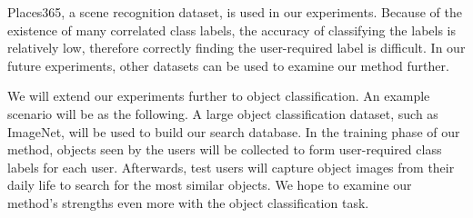 Places365, a scene recognition dataset, is used in our experiments. 
Because of the existence of many correlated class labels, the accuracy of classifying the labels is relatively low, therefore correctly finding the user-required label is difficult. 
In our future experiments, other datasets can be used to examine our method further. 

We will extend our experiments further to object classification. 
An example scenario will be as the following.
A large object classification dataset, such as ImageNet, will be used to build our search database.
In the training phase of our method, objects seen by the users will be collected to form user-required class labels for each user. 
Afterwards, test users will capture object images from their daily life to search for the most similar objects. 
We hope to examine our method's strengths even more with the object classification task.


